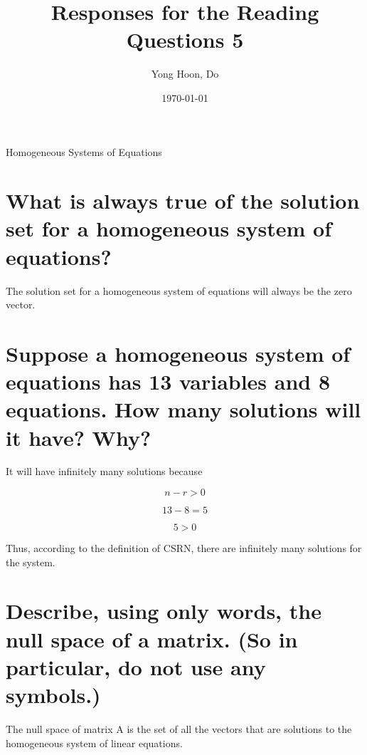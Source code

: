 \documentclass{article}
\title{Responses for the Reading Questions 5}
\author{Yong Hoon, Do}
\date{\today}
\begin{document}
\maketitle

\begin{center}
Homogeneous Systems of Equations
\end{center}

\section{What is always true of the solution set for a homogeneous system of equations?}
The solution set for a homogeneous system of equations will always be the zero vector.

\section{Suppose a homogeneous system of equations has 13 variables and 8 equations. How many solutions will it have? Why?}
It will have infinitely many solutions because

\begin{equation}
n - r > 0
\end{equation}

\begin{equation}
13 - 8 = 5
\end{equation}

\begin{equation}
5 > 0
\end{equation}

Thus, according to the definition of CSRN, there are infinitely many solutions for the system.

\section{Describe, using only words, the null space of a matrix. (So in particular, do not use any symbols.)}
The null space of matrix A is the set of all the vectors that are solutions to the homogeneous system of linear equations.
\end{document}
